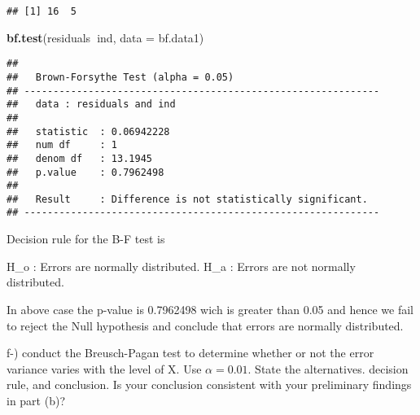 \documentclass[
]{article}
\newenvironment{Shaded}{\begin{snugshade}}{\end{snugshade}}
\newcommand{\CommentTok}[1]{\textcolor[rgb]{0.56,0.35,0.01}{\textit{#1}}}
\newcommand{\DataTypeTok}[1]{\textcolor[rgb]{0.13,0.29,0.53}{#1}}
\newcommand{\DecValTok}[1]{\textcolor[rgb]{0.00,0.00,0.81}{#1}}
\newcommand{\KeywordTok}[1]{\textcolor[rgb]{0.13,0.29,0.53}{\textbf{#1}}}
\newcommand{\NormalTok}[1]{#1}
\newcommand{\OperatorTok}[1]{\textcolor[rgb]{0.81,0.36,0.00}{\textbf{#1}}}
\newcommand{\StringTok}[1]{\textcolor[rgb]{0.31,0.60,0.02}{#1}}
\begin{document}
\begin{Shaded}
\end{Shaded}

\begin{verbatim}
## [1] 16  5
\end{verbatim}

\begin{Shaded}
\begin{Highlighting}[]
\KeywordTok{bf.test}\NormalTok{(residuals}\OperatorTok{~}\NormalTok{ind, }\DataTypeTok{data =}\NormalTok{ bf.data1)}
\end{Highlighting}
\end{Shaded}

\begin{verbatim}
## 
##   Brown-Forsythe Test (alpha = 0.05) 
## ------------------------------------------------------------- 
##   data : residuals and ind 
## 
##   statistic  : 0.06942228 
##   num df     : 1 
##   denom df   : 13.1945 
##   p.value    : 0.7962498 
## 
##   Result     : Difference is not statistically significant. 
## -------------------------------------------------------------
\end{verbatim}

Decision rule for the B-F test is

H\_o : Errors are normally distributed. H\_a : Errors are not normally
distributed.

In above case the p-value is 0.7962498 wich is greater than 0.05 and
hence we fail to reject the Null hypothesis and conclude that errors are
normally distributed.

f-) conduct the Breusch-Pagan test to determine whether or not the error
variance varies with the level of X. Use \(\alpha=0.01\). State the
alternatives. decision rule, and conclusion. Is your conclusion
consistent with your preliminary findings in part (b)?
\end{document}
